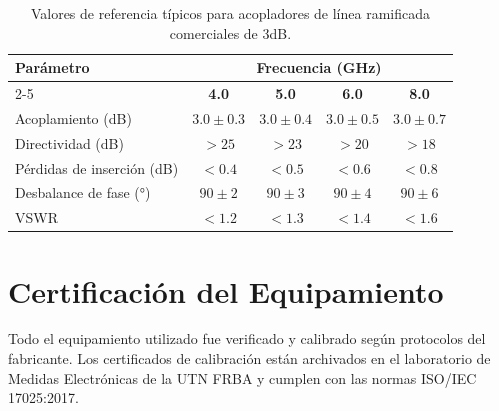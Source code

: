 \begin{table}[h]
\centering
\begin{tabular}{|l|c|c|c|c|}
\hline
\textbf{Parámetro} & \multicolumn{4}{c|}{\textbf{Frecuencia (GHz)}} \\
\cline{2-5}
& \textbf{4.0} & \textbf{5.0} & \textbf{6.0} & \textbf{8.0} \\
\hline
Acoplamiento (dB) & $3.0 \pm 0.3$ & $3.0 \pm 0.4$ & $3.0 \pm 0.5$ & $3.0 \pm 0.7$ \\
\hline
Directividad (dB) & $>25$ & $>23$ & $>20$ & $>18$ \\
\hline
Pérdidas de inserción (dB) & $<0.4$ & $<0.5$ & $<0.6$ & $<0.8$ \\
\hline
Desbalance de fase (°) & $90 \pm 2$ & $90 \pm 3$ & $90 \pm 4$ & $90 \pm 6$ \\
\hline
VSWR & $<1.2$ & $<1.3$ & $<1.4$ & $<1.6$ \\
\hline
\end{tabular}
\caption{Valores de referencia típicos para acopladores de línea ramificada comerciales de 3dB.}
\end{table}

\vspace{-0.5cm}
\section*{Certificación del Equipamiento}
\vspace{-0.3cm}
Todo el equipamiento utilizado fue verificado y calibrado según protocolos del fabricante. Los certificados de calibración están archivados en el laboratorio de Medidas Electrónicas de la UTN FRBA y cumplen con las normas ISO/IEC 17025:2017.